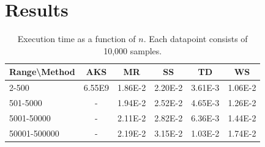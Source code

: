 \section{Results}







\begin{table}
\centering
\caption{Execution time as a function of $n$. Each datapoint consists of 10,000 samples.}
\begin{tabular}{|l|c|c|c|c|c|} \hline
Range\textbackslash Method&AKS&MR&SS&TD&WS \\ \hline
2-500&6.55E9&1.86E-2&2.20E-2&3.61E-3&1.06E-2 \\ \hline
501-5000&-&1.94E-2&2.52E-2&4.65E-3&1.26E-2 \\ \hline
5001-50000&-&2.11E-2&2.82E-2&6.36E-3&1.44E-2 \\ \hline
50001-500000&-&2.19E-2&3.15E-2&1.03E-2&1.74E-2 \\ \hline
\end{tabular}
\label{tab:pressure}
\end{table}






